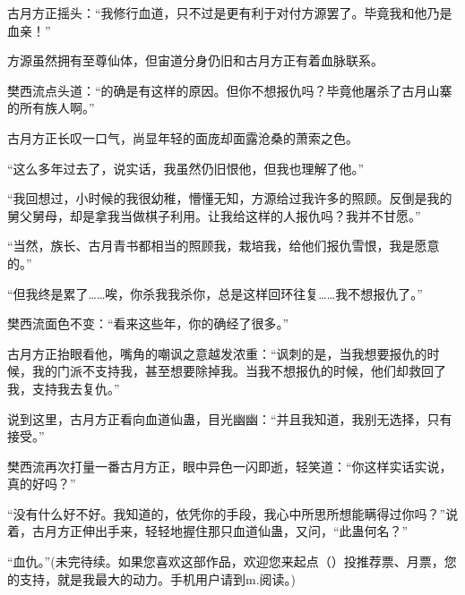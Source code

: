 \begin{this_body}
古月方正摇头：“我修行血道，只不过是更有利于对付方源罢了。毕竟我和他乃是血亲！”

方源虽然拥有至尊仙体，但宙道分身仍旧和古月方正有着血脉联系。

樊西流点头道：“的确是有这样的原因。但你不想报仇吗？毕竟他屠杀了古月山寨的所有族人啊。”

古月方正长叹一口气，尚显年轻的面庞却面露沧桑的萧索之色。

“这么多年过去了，说实话，我虽然仍旧恨他，但我也理解了他。”

“我回想过，小时候的我很幼稚，懵懂无知，方源给过我许多的照顾。反倒是我的舅父舅母，却是拿我当做棋子利用。让我给这样的人报仇吗？我并不甘愿。”

“当然，族长、古月青书都相当的照顾我，栽培我，给他们报仇雪恨，我是愿意的。”

“但我终是累了……唉，你杀我我杀你，总是这样回环往复……我不想报仇了。”

樊西流面色不变：“看来这些年，你的确经了很多。”

古月方正抬眼看他，嘴角的嘲讽之意越发浓重：“讽刺的是，当我想要报仇的时候，我的门派不支持我，甚至想要除掉我。当我不想报仇的时候，他们却救回了我，支持我去复仇。”

说到这里，古月方正看向血道仙蛊，目光幽幽：“并且我知道，我别无选择，只有接受。”

樊西流再次打量一番古月方正，眼中异色一闪即逝，轻笑道：“你这样实话实说，真的好吗？”

“没有什么好不好。我知道的，依凭你的手段，我心中所思所想能瞒得过你吗？”说着，古月方正伸出手来，轻轻地握住那只血道仙蛊，又问，“此蛊何名？”

“血仇。”(未完待续。如果您喜欢这部作品，欢迎您来起点（）投推荐票、月票，您的支持，就是我最大的动力。手机用户请到m.阅读。)

\end{this_body}

